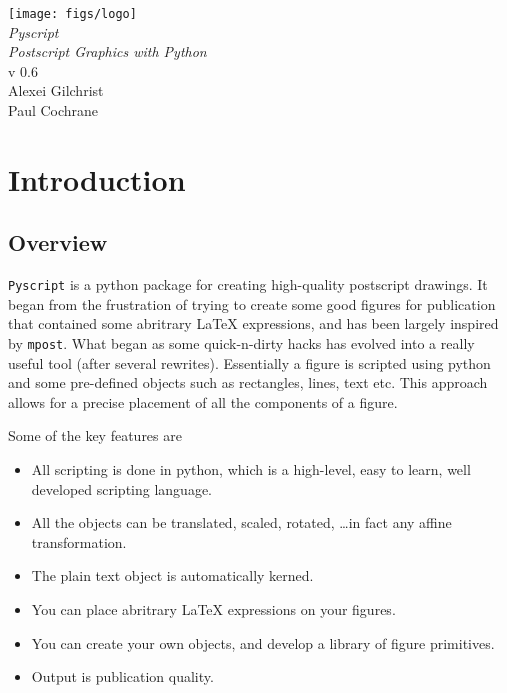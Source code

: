 \documentclass[a4paper]{book}
\begin{document}
\begin{titlepage}
\begin{center}
\vspace*{3cm}
\LARGE

\texttt{[image: figs/logo]}\\[4cm]

{\Huge \emph{Pyscript}}\\[1cm]
\emph{Postscript Graphics with Python}\\[2cm]

v 0.6\\[2cm]

Alexei Gilchrist\\
Paul Cochrane
\end{center}
\end{titlepage}

\frontmatter

\tableofcontents

\mainmatter

\chapter{Introduction}
\label{cha:introduction}


\section{Overview}

\Verb|Pyscript| is a python package for creating high-quality postscript
drawings.  It began from the frustration of trying to create some good figures
for publication that contained some abritrary \LaTeX{} expressions, and has
been largely inspired by \Verb|mpost|. What began as some quick-n-dirty hacks
has evolved into a really useful tool (after several rewrites). Essentially a
figure is scripted using python and some pre-defined objects such as
rectangles, lines, text etc. This approach allows for a precise placement of
all the components of a figure.

Some of the key features are
\begin{itemize}
\item All scripting is done in python, which is a high-level, easy to
  learn, well developed scripting language.
\item All the objects can be translated, scaled, rotated, \ldots in fact any
affine transformation.  
\item The plain text object is automatically kerned.
\item You can place abritrary \LaTeX{} expressions on your figures.
\item You can create your own objects, and develop a library of figure 
primitives. 
\item Output is publication quality.
\end{itemize}
\end{document}
